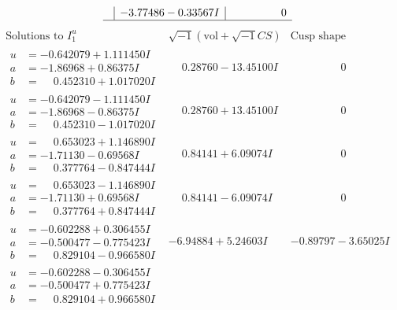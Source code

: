 \documentclass[1p]{elsarticle_modified}
\theoremstyle{definition}
\newcommand{\I}{\sqrt{-1}}
\begin{document}
$$\begin{array}{c|c|c}
 & -3.77486 - 0.33567 I & \phantom{-0.000000 } 0\\
 \hline 
 \end{array}$$\newpage$$\begin{array}{c|c|c}  
\text{Solutions to }I^u_{1}& \I (\text{vol} + \sqrt{-1}CS) & \text{Cusp shape}\\
 \hline 
\begin{aligned}
u &= -0.642079 + 1.111450 I \\
a &= -1.86968 + 0.86375 I \\
b &= \phantom{-}0.452310 + 1.017020 I\end{aligned}
 & \phantom{-}0.28760 - 13.45100 I & \phantom{-0.000000 } 0 \\ \hline\begin{aligned}
u &= -0.642079 - 1.111450 I \\
a &= -1.86968 - 0.86375 I \\
b &= \phantom{-}0.452310 - 1.017020 I\end{aligned}
 & \phantom{-}0.28760 + 13.45100 I & \phantom{-0.000000 } 0 \\ \hline\begin{aligned}
u &= \phantom{-}0.653023 + 1.146890 I \\
a &= -1.71130 - 0.69568 I \\
b &= \phantom{-}0.377764 - 0.847444 I\end{aligned}
 & \phantom{-}0.84141 + 6.09074 I & \phantom{-0.000000 } 0 \\ \hline\begin{aligned}
u &= \phantom{-}0.653023 - 1.146890 I \\
a &= -1.71130 + 0.69568 I \\
b &= \phantom{-}0.377764 + 0.847444 I\end{aligned}
 & \phantom{-}0.84141 - 6.09074 I & \phantom{-0.000000 } 0 \\ \hline\begin{aligned}
u &= -0.602288 + 0.306455 I \\
a &= -0.500477 - 0.775423 I \\
b &= \phantom{-}0.829104 - 0.966580 I\end{aligned}
 & -6.94884 + 5.24603 I & -0.89797 - 3.65025 I \\ \hline\begin{aligned}
u &= -0.602288 - 0.306455 I \\
a &= -0.500477 + 0.775423 I \\
b &= \phantom{-}0.829104 + 0.966580 I\end{aligned}

\end{array}$$
\end{document}
